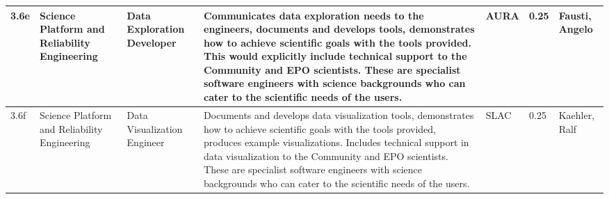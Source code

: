 \begin{longtable} {|l|p{}|p{}|p{}|l|l|l|}
{3.6e}&{Science Platform and Reliability Engineering}&{Data Exploration Developer}&{Communicates data exploration needs to the engineers, documents and develops tools, demonstrates how to achieve scientific goals with the tools provided. This would explicitly include technical support to the Community and EPO scientists. These are specialist software engineers with science backgrounds who can cater to the scientific needs of the users.}&{AURA}&{0.25}&{Fausti, Angelo} \\ \hline
{3.6f}&{Science Platform and Reliability Engineering}&{Data Visualization Engineer}&{Documents and develops data visualization tools, demonstrates how to achieve scientific goals with the tools provided, produces example visualizations. Includes technical support in data visualization to the Community and EPO scientists. These are specialist software engineers with science backgrounds who can cater to the scientific needs of the users.}&{SLAC}&{0.25}&{Kaehler, Ralf} \\ \hline
\end{longtable} \normalsize
